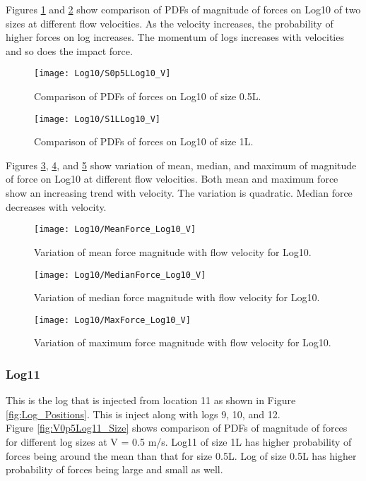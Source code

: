 \noindent Figures \ref{fig:S0p5LLog10_V} and \ref{fig:S1LLog10_V} show comparison of PDFs of magnitude of forces on Log10 of two sizes at different flow velocities. As the velocity increases, the probability of higher forces on log increases. The momentum of logs increases with velocities and so does the impact force.

\begin{figure}
\centering
\texttt{[image: Log10/S0p5LLog10\_V]}
\caption{\label{fig:S0p5LLog10_V}Comparison of PDFs of forces on Log10 of size 0.5L.}
\end{figure}
\begin{figure}
\centering
\texttt{[image: Log10/S1LLog10\_V]}
\caption{\label{fig:S1LLog10_V}Comparison of PDFs of forces on Log10 of size 1L.}
\end{figure}

\noindent Figures \ref{fig:MeanForce_Log10_V}, \ref{fig:MedianForce_Log10_V}, and \ref{fig:MaxForce_Log10_V} show variation of mean, median, and maximum of magnitude of force on Log10 at different flow velocities. Both mean and maximum force show an increasing trend with velocity. The variation is quadratic. Median force decreases with velocity.

\begin{figure}
\centering
\texttt{[image: Log10/MeanForce\_Log10\_V]}
\caption{\label{fig:MeanForce_Log10_V}Variation of mean force magnitude with flow velocity for Log10.}
\end{figure}
\begin{figure}
\centering
\texttt{[image: Log10/MedianForce\_Log10\_V]}
\caption{\label{fig:MedianForce_Log10_V}Variation of median force magnitude with flow velocity for Log10.}
\end{figure}
\begin{figure}
\centering
\texttt{[image: Log10/MaxForce\_Log10\_V]}
\caption{\label{fig:MaxForce_Log10_V}Variation of maximum force magnitude with flow velocity for Log10.}
\end{figure}

\FloatBarrier
\subsubsection{Log11}
This is the log that is injected from location 11 as shown in Figure \ref{fig:Log_Positions}. This is inject along with logs 9, 10, and 12.\\ 
Figure \ref{fig:V0p5Log11_Size} shows comparison of PDFs of magnitude of forces for different log sizes at V = 0.5 m/s. Log11 of size 1L has higher probability of forces being around the mean than that for size 0.5L. Log of size 0.5L has higher probability of forces being large and small as well.

